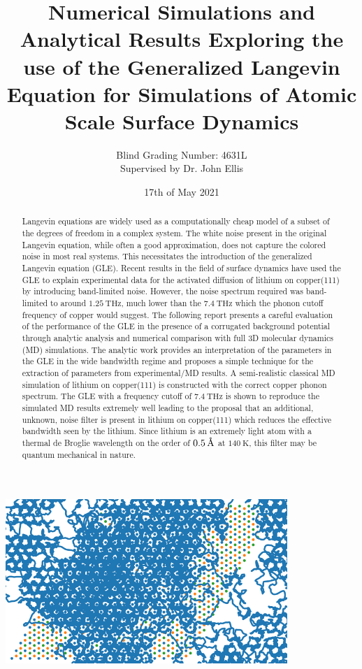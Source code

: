 \documentclass[notitlepage]{report}
\title{Numerical Simulations and Analytical Results Exploring the use of the Generalized Langevin Equation for Simulations of Atomic Scale Surface Dynamics}
\author{Blind Grading Number: 4631L \\[0.3cm]{Supervised by Dr. John Ellis}}
\date{17th of May 2021}
\newcommand{\angstrom}{\text{\normalfont\AA}}
\newcommand{\thz}{\si{\tera\hertz}}
\begin{document}
\maketitle
\thispagestyle{empty}

\begin{abstract}

	Langevin equations are widely used as a computationally cheap model of a subset of the degrees of freedom in a complex system. The white noise present in the original Langevin equation, while often a good approximation, does not capture the colored noise in most real systems. This necessitates the introduction of the generalized Langevin equation (GLE). Recent results in the field of surface dynamics \cite{Ward} have used the GLE to explain experimental data for the activated diffusion of lithium on copper(111) by introducing band-limited noise. However, the noise spectrum required was band-limited to around $\SI{1.25}{\thz}$, much lower than the $\SI{7.4}{\thz}$ \cite{sinha} which the phonon cutoff frequency of copper would suggest. The following report presents a careful evaluation of the performance of the GLE in the presence of a corrugated background potential through analytic analysis and numerical comparison with full 3D molecular dynamics (MD) simulations. The analytic work provides an interpretation of the parameters in the GLE in the wide bandwidth regime and proposes a simple technique for the extraction of parameters from experimental/MD results. A semi-realistic classical MD simulation of lithium on copper(111) is constructed with the correct copper phonon spectrum. The GLE with a frequency cutoff of $\SI{7.4}{\thz}$ is shown to reproduce the simulated MD results extremely well leading to the proposal that an additional, unknown, noise filter is present in lithium on copper(111) which reduces the effective bandwidth seen by the lithium. Since lithium is an extremely light atom with a thermal de Broglie wavelength on the order of $\SI{0.5}{\angstrom}$ at $\SI{140}{\kelvin}$, this filter may be quantum mechanical in nature.  

\end{abstract}


\vspace{1cm}
\begin{center}
\includegraphics[width=0.80\textwidth]{md_top_down}
\end{center}
\end{document}
